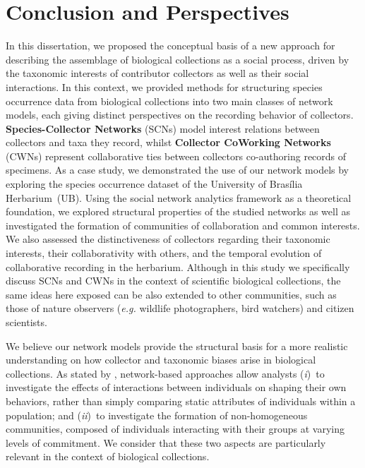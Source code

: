 \chapter{Conclusion and Perspectives}\label{conclusion_perspectives}
In this dissertation, we proposed the conceptual basis of a new approach for describing the assemblage of biological collections as a social process, driven by the taxonomic interests of contributor collectors as well as their social interactions.
In this context, we provided methods for structuring species occurrence data from biological collections into two main classes of network models, each giving distinct perspectives on the recording behavior of collectors.
\textbf{Species-Collector Networks} (SCNs) model interest relations between collectors and taxa they record, whilst \textbf{Collector CoWorking Networks} (CWNs) represent collaborative ties between collectors co-authoring records of specimens. 
As a case study, we demonstrated the use of our network models by exploring the species occurrence dataset of the University of Brasília Herbarium~(UB).
Using the social network analytics framework \cite{Barbier2011,Stork2015} as a theoretical foundation, we explored structural properties of the studied networks as well as 
investigated the formation of communities of collaboration and common interests.
We also assessed the distinctiveness of collectors regarding their taxonomic interests, their collaborativity with others, and the temporal evolution of collaborative recording in the herbarium.
Although in this study we specifically discuss SCNs and CWNs in the context of scientific biological collections, the same ideas here exposed can be also extended to other communities, such as those of nature observers (\textit{e.g.} wildlife photographers, bird watchers) and citizen scientists.


We believe our network models provide the structural basis for a more realistic understanding on how collector and taxonomic biases arise in biological collections. 
As stated by , network-based approaches allow analysts 
(\textit{i})~to investigate the effects of interactions between individuals on shaping their own behaviors, rather than simply comparing static attributes of individuals within a population; and
(\textit{ii})~to investigate the formation of non-homogeneous communities, composed of individuals interacting with their groups at varying levels of commitment.
We consider that these two aspects are particularly relevant in the context of biological collections.

